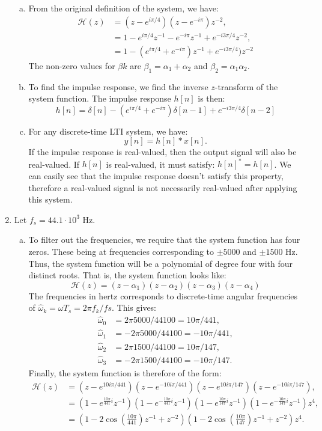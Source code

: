\begin{enumerate}
\begin{enumerate}[a)]
\item From the original definition of the system, we have:
\begin{align*}
    \mathcal{H}(z) &=(z-e^{i\pi/4})(z-e^{-i\pi})z^{-2}, \\
                   &=1-e^{i\pi/4}z^{-1}-e^{-i\pi}z^{-1}+e^{-i3\pi/4}z^{-2}, \\
                   &=1 -(e^{i\pi/4}+e^{-i\pi})z^{-1} + e^{-i3\pi/4})z^{-2}
\end{align*}
The non-zero values for $\beta{k}$ are $\beta_1=\alpha_{1}+\alpha_{2}$ and $\beta_2=\alpha_{1}\alpha_{2}$. 

\item To find the impulse response, we find the inverse $z$-transform of the system function. The impulse response $h[n]$ is then:
$$h[n]=\delta[n]-(e^{i\pi/4}+e^{-i\pi})\delta[n-1]+e^{-i3\pi/4}\delta[n-2]$$

\item For any discrete-time LTI system, we have:
$$y[n]=h[n]*x[n].$$
If the impulse response is real-valued, then the output signal will also be real-valued. If $h[n]$ is real-valued, it must satisfy: $h[n]^{*}=h[n]$. We can easily see that the impulse response doesn't satisfy this property, therefore a real-valued signal is not necessarily real-valued after applying this system. 

\end{enumerate}

\item Let $f_{s}=44.1\cdot 10^{3}$ Hz. 

\begin{enumerate}[a)]
\item To filter out the frequencies, we require that the system function has four zeros. These being at frequencies corresponding to $\pm5000$ and $\pm1500$ Hz. Thus, the system function will be a polynomial of degree four with four distinct roots. That is, the system function looks like:
$$\mathcal{H}(z)=(z-\alpha_1)(z-\alpha_2)(z-\alpha_3)(z-\alpha_4)$$
The frequencies in hertz corresponds to discrete-time angular frequencies of $\hat{\omega}_k=\omega T_s=2\pi f_k/fs$. This gives:
\begin{align*}
    \hat{\omega}_{0} &=  2\pi5000/44100 =  10\pi/441,\\
    \hat{\omega}_{1} &= -2\pi5000/44100 = -10\pi/441,\\
    \hat{\omega}_{2} &=  2\pi1500/44100 =  10\pi/147,\\
    \hat{\omega}_{3} &= -2\pi1500/44100 = -10\pi/147.
\end{align*}
Finally, the system function is therefore of the form:
\begin{align*}
    \mathcal{H}(z)&=(z-e^{10i\pi/441})(z-e^{-10i\pi/441})(z-e^{10i\pi/147})(z-e^{-10i\pi/147}), \\
    &=(1-e^{\frac{10\pi}{441}i}z^{-1})(1-e^{-\frac{10\pi}{441}i}z^{-1})(1-e^{\frac{10\pi}{147}i}z^{-1})(1-e^{-\frac{10\pi}{147}i}z^{-1})z^{4},\\
    &=(1-2\cos\left(\frac{10\pi}{441}\right)z^{-1}+z^{-2})(1-2\cos\left(\frac{10\pi}{147}\right)z^{-1}+z^{-2})z^{4}.
\end{align*}


\end{enumerate}
\end{enumerate}
